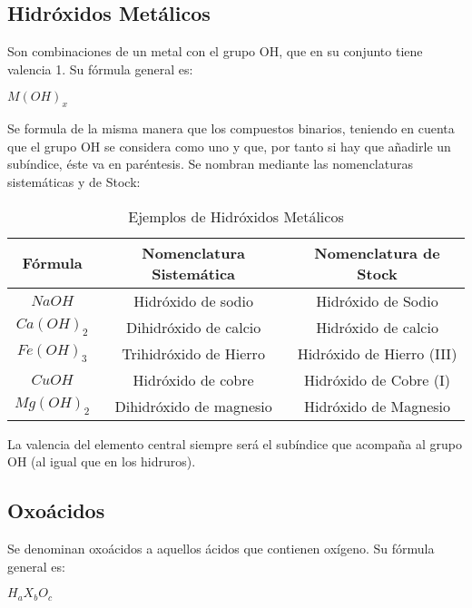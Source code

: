 \documentclass[11pt,fleqn]{book} %
\begin{document}
\subsection{Hidróxidos Metálicos}
Son combinaciones de un metal con el grupo OH, que en su conjunto tiene valencia 1. Su fórmula general es:
\begin{center}
	$M(OH)_x$
\end{center}
Se formula de la misma manera que los compuestos binarios, teniendo en cuenta que el grupo OH se considera como uno y que, por tanto si hay que añadirle un subíndice, éste va en paréntesis. Se nombran mediante las nomenclaturas sistemáticas y de Stock:
\begin{table}[h!]
	\centering
	\begin{tabular}{c|cc}
		Fórmula&Nomenclatura Sistemática&Nomenclatura de Stock\\ \hline
		$NaOH$&Hidróxido de sodio&Hidróxido de Sodio\\ 
		$Ca(OH)_{2}$&Dihidróxido de calcio&Hidróxido de calcio\\
		$Fe(OH)_{3}$&Trihidróxido de Hierro&Hidróxido de Hierro (III)\\
		$CuOH$&Hidróxido de cobre&Hidróxido de Cobre (I)\\
		$Mg(OH)_{2}$&Dihidróxido de magnesio&Hidróxido de Magnesio\\ \hline
	\end{tabular}
	\caption{Ejemplos de Hidróxidos Metálicos}
\end{table}
La valencia del elemento central siempre será el subíndice que acompaña al grupo OH (al igual que en los hidruros).
\subsection{Oxoácidos}
Se denominan oxoácidos a aquellos ácidos que contienen oxígeno. Su fórmula general es:
\begin{center}
	$H_{a}X_{b}O_{c}$
\end{center}
\end{document}
